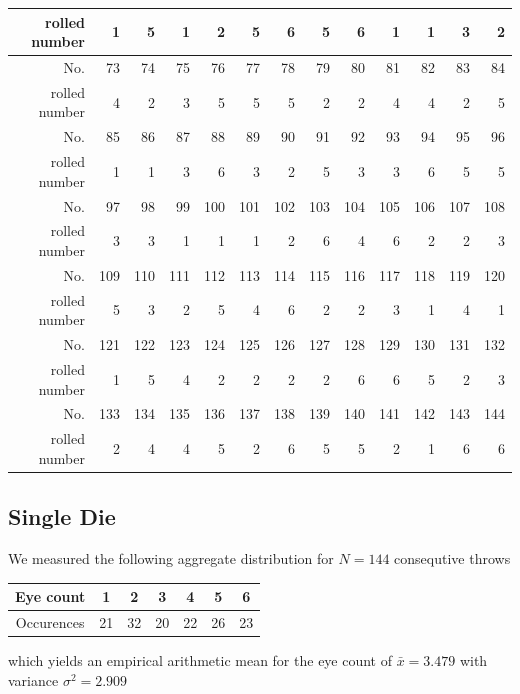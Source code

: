 \documentclass{scrreprt}
\begin{document}
\begin{table}[H]
\begin{tabular}{r||rrrrrrrrrrrr}
    rolled number & 1     & 5     & 1     & 2     & 5     & 6     & 5     & 6     & 1     & 1     & 3     & 2 \\ \hline
    No.   & 73    & 74    & 75    & 76    & 77    & 78    & 79    & 80    & 81    & 82    & 83    & 84 \\
    rolled number & 4     & 2     & 3     & 5     & 5     & 5     & 2     & 2     & 4     & 4     & 2     & 5 \\ \hline
    No.   & 85    & 86    & 87    & 88    & 89    & 90    & 91    & 92    & 93    & 94    & 95    & 96 \\
    rolled number & 1     & 1     & 3     & 6     & 3     & 2     & 5     & 3     & 3     & 6     & 5     & 5 \\ \hline
    No.   & 97    & 98    & 99    & 100   & 101   & 102   & 103   & 104   & 105   & 106   & 107   & 108 \\
    rolled number & 3     & 3     & 1     & 1     & 1     & 2     & 6     & 4     & 6     & 2     & 2     & 3 \\ \hline
    No.   & 109   & 110   & 111   & 112   & 113   & 114   & 115   & 116   & 117   & 118   & 119   & 120 \\
    rolled number & 5     & 3     & 2     & 5     & 4     & 6     & 2     & 2     & 3     & 1     & 4     & 1 \\ \hline
    No.   & 121   & 122   & 123   & 124   & 125   & 126   & 127   & 128   & 129   & 130   & 131   & 132 \\
    rolled number & 1     & 5     & 4     & 2     & 2     & 2     & 2     & 6     & 6     & 5     & 2     & 3 \\ \hline
    No.   & 133   & 134   & 135   & 136   & 137   & 138   & 139   & 140   & 141   & 142   & 143   & 144 \\
    rolled number & 2     & 4     & 4     & 5     & 2     & 6     & 5     & 5     & 2     & 1     & 6     & 6 \\ \hline
    \end{tabular}%
\end{table}%

\subsection{Single Die}
We measured the following aggregate distribution for $N=144$ consequtive throws

\begin{center}
    \begin{tabular}{|c|cccccc|}
    \hline
    Eye count & 1 & 2 & 3 & 4 & 5 & 6\\
    \hline
    Occurences & 21 & 32 & 20 & 22 & 26 & 23\\
    \hline
    \end{tabular}
\end{center}
which yields an empirical arithmetic mean for the eye count of $\bar{x} = 3.479$ with variance $\sigma^2 = 2.909$
\end{document}
